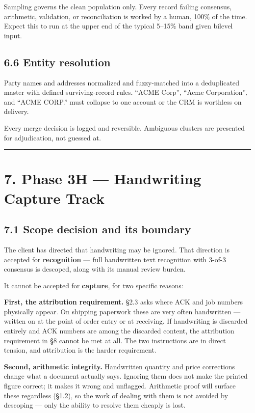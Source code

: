 \documentclass[
]{article}
\begin{document}
Sampling governs the clean population only. Every record failing
consensus, arithmetic, validation, or reconciliation is worked by a
human, 100\% of the time. Expect this to run at the upper end of the
typical 5--15\% band given bilevel input.

\subsection{6.6 Entity resolution}\label{entity-resolution}

Party names and addresses normalized and fuzzy-matched into a
deduplicated master with defined surviving-record rules. ``ACME Corp'',
``Acme Corporation'', and ``ACME CORP.'' must collapse to one account or
the CRM is worthless on delivery.

Every merge decision is logged and reversible. Ambiguous clusters are
presented for adjudication, not guessed at.

\begin{center}\rule{0.5\linewidth}{0.5pt}\end{center}

\section{7. Phase 3H --- Handwriting Capture
Track}\label{phase-3h-handwriting-capture-track}

\subsection{7.1 Scope decision and its
boundary}\label{scope-decision-and-its-boundary}

The client has directed that handwriting may be ignored. That direction
is accepted for \textbf{recognition} --- full handwritten text
recognition with 3-of-3 consensus is descoped, along with its manual
review burden.

It cannot be accepted for \textbf{capture}, for two specific reasons:

\textbf{First, the attribution requirement.} §2.3 asks where ACK and job
numbers physically appear. On shipping paperwork these are very often
handwritten --- written on at the point of order entry or at receiving.
If handwriting is discarded entirely and ACK numbers are among the
discarded content, the attribution requirement in §8 cannot be met at
all. The two instructions are in direct tension, and attribution is the
harder requirement.

\textbf{Second, arithmetic integrity.} Handwritten quantity and price
corrections change what a document actually says. Ignoring them does not
make the printed figure correct; it makes it wrong and unflagged.
Arithmetic proof will surface these regardless (§1.2), so the work of
dealing with them is not avoided by descoping --- only the ability to
resolve them cheaply is lost.
\end{document}
